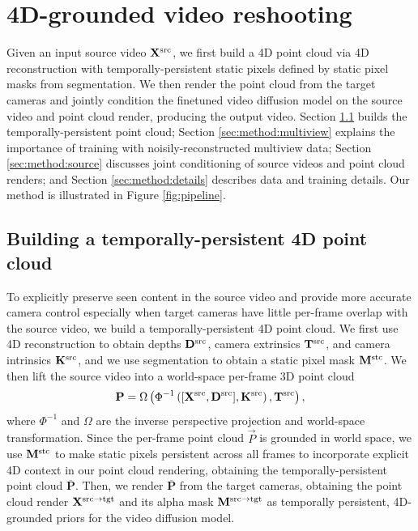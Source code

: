 \section{4D-grounded video reshooting}
\label{sec:method}

Given an input source video $\mathbf{X}^{\mathrm{src}}$, we first build a 4D point cloud via 4D reconstruction with temporally-persistent static pixels defined by static pixel masks from segmentation. We then render the point cloud from the target cameras and jointly condition the finetuned video diffusion model on the source video and point cloud render, producing the output video. Section \ref{sec:method:point_cloud} builds the temporally-persistent point cloud; Section \ref{sec:method:multiview} explains the importance of training with noisily-reconstructed multiview data; Section \ref{sec:method:source} discusses joint conditioning of source videos and point cloud renders; and Section \ref{sec:method:details} describes data and training details. Our method is illustrated in Figure \ref{fig:pipeline}.

\subsection{Building a temporally-persistent 4D point cloud}
\label{sec:method:point_cloud}

To explicitly preserve seen content in the source video and provide more accurate camera control especially when target cameras have little per-frame overlap with the source video, we build a temporally-persistent 4D point cloud. We first use 4D reconstruction \cite{wang2025pi3, lan2025stream3r} to obtain depths $\mathbf{D}^{\mathrm{src}}$, camera extrinsics $\mathbf{T}^{\mathrm{src}}$, and camera intrinsics $\mathbf{K}^{\mathrm{src}}$, and we use segmentation \cite{ravi2024sam2, ren2024groundingdino, ren2024groundedsam} to obtain a static pixel mask $\mathbf{M}^{\mathrm{stc}}$. We then lift the source video into a world-space per-frame 3D point cloud
\begin{equation}\label{eqn:img_to_wld}
    \mathbf{P} = \Omega\left( \Phi^{-1}\left( [\mathbf{X}^{\mathrm{src}}, \mathbf{D}^{\mathrm{src}}], \mathbf{K}^{\mathrm{src}} \right), \mathbf{T}^{\mathrm{src}} \right) ,
\end{equation}
where $\Phi^{-1}$ and $\Omega$ are the inverse perspective projection and world-space transformation. Since the per-frame point cloud $\vec{P}$ is grounded in world space, we use $\mathbf{M}^{\mathrm{stc}}$ to make static pixels persistent across all frames to incorporate explicit 4D context in our point cloud rendering, obtaining the temporally-persistent point cloud $\overline{\mathbf{P}}$. Then, we render $\overline{\mathbf{P}}$ from the target cameras, obtaining the point cloud render $\mathbf{X}^{\mathrm{src \to tgt}}$ and its alpha mask $\mathbf{M}^{\mathrm{src \to tgt}}$ as temporally persistent, 4D-grounded priors for the video diffusion model.

